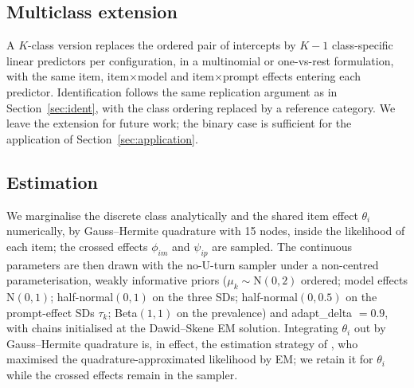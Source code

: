 \subsection{Multiclass extension}\label{sec:multiclass}
A $K$-class version replaces the ordered pair of intercepts by $K - 1$ class-specific linear predictors per configuration, in a multinomial or one-vs-rest formulation, with the same item, item$\times$model and item$\times$prompt effects entering each predictor. Identification follows the same replication argument as in Section~\ref{sec:ident}, with the class ordering replaced by a reference category. We leave the extension for future work; the binary case is sufficient for the application of Section~\ref{sec:application}.

\subsection{Estimation}\label{sec:estimation}

We marginalise the discrete class analytically and the shared item effect $\theta_i$
numerically, by Gauss--Hermite quadrature with 15 nodes, inside the likelihood of each
item; the crossed effects $\phi_{im}$ and $\psi_{ip}$ are sampled. The continuous
parameters are then drawn with the no-U-turn sampler \citep[Stan via
cmdstanr;][]{Carpenter2017} under a non-centred parameterisation, weakly informative
priors ($\mu_k \sim \mathrm{N}(0, 2)$ ordered; model effects $\mathrm{N}(0, 1)$;
half-normal$(0, 1)$ on the three SDs; half-normal$(0, 0.5)$ on the prompt-effect SDs
$\tau_k$; Beta$(1, 1)$ on the prevalence) and adapt\_delta $= 0.9$, with chains
initialised at the Dawid--Skene EM solution. Integrating $\theta_i$ out by Gauss--Hermite quadrature is, in effect, the estimation strategy of \citet{Qu1996}, who maximised the quadrature-approximated likelihood by EM; we retain it for $\theta_i$ while the crossed effects remain in the sampler.

